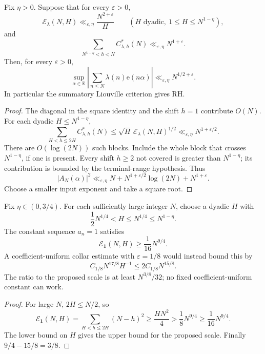 
\begin{proposition}
\label{prop:terminal-collar-retained}
Fix \(\eta>0\). Suppose that for every \(\varepsilon>0\),
\[
 \mathcal E_\lambda(N,H)
 \ll_{\varepsilon,\eta}\frac{N^{2+\varepsilon}}H
 \qquad
 (H\text{ dyadic},\ 1\le H\le N^{1-\eta}),
\]
and
\[
 \sum_{N^{1-\eta}<h<N}C^*_{\lambda,h}(N)
       \ll_{\varepsilon,\eta}N^{1+\varepsilon}.
\]
Then, for every \(\varepsilon>0\),
\[
 \sup_{\alpha\in\mathbb R}
 \left|\sum_{n\le N}\lambda(n)\mathrm e(n\alpha)\right|
       \ll_{\varepsilon,\eta}N^{1/2+\varepsilon}.
\]
In particular the summatory Liouville criterion gives RH.
\end{proposition}
\begin{proof}
The diagonal in the square identity and the shift \(h=1\) contribute
\(O(N)\). For each dyadic \(H\le N^{1-\eta}\),
\[
 \sum_{H<h\le2H}C^*_{\lambda,h}(N)
 \le\sqrt H\,\mathcal E_\lambda(N,H)^{1/2}
 \ll_{\varepsilon,\eta}N^{1+\varepsilon/2}.
\]
There are \(O(\log(2N))\) such blocks. Include the whole block that
crosses \(N^{1-\eta}\), if one is present. Every shift \(h\ge2\) not
covered is greater than \(N^{1-\eta}\); its contribution is bounded
by the terminal-range hypothesis. Thus
\[
 |A_N(\alpha)|^2
 \ll_{\varepsilon,\eta}
 N+N^{1+\varepsilon/2}\log(2N)+N^{1+\varepsilon}.
\]
Choose a smaller input exponent and take a square root.
\end{proof}

\begin{corollary}
\label{cor:original-coefficient-gap}
Fix \(\eta\in(0,3/4)\). For each sufficiently large integer \(N\), choose
a dyadic \(H\) with
\[
 \frac12N^{1/4}<H\le N^{1/4}\le N^{1-\eta}.
\]
The constant sequence \(a_n=1\) satisfies
\[
 \mathcal E_{\mathbf1}(N,H)\ge\frac1{16}N^{9/4}.
\]
A coefficient-uniform collar estimate with \(\varepsilon=1/8\)
would instead bound this by
\[
 C_{1/8}N^{17/8}H^{-1}\le2C_{1/8}N^{15/8}.
\]
The ratio to the proposed scale is at least \(N^{3/8}/32\);
no fixed coefficient-uniform constant can work.
\end{corollary}
\begin{proof}
For large \(N\), \(2H\le N/2\), so
\[
 \mathcal E_{\mathbf1}(N,H)
 =\sum_{H<h\le2H}(N-h)^2
 \ge\frac{HN^2}4>\frac18N^{9/4}\ge\frac1{16}N^{9/4}.
\]
The lower bound on \(H\) gives the upper bound for the proposed scale.
Finally \(9/4-15/8=3/8\).
\end{proof}

